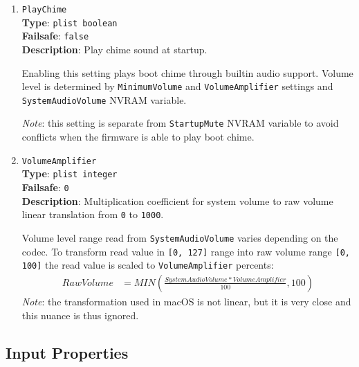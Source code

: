 \documentclass[]{article}
\makeatletter
\renewcommand{\label}[1]{%
\zref@wrapper@immediate{\oldlabel{#1}}}  %
\makeatother
\begin{document}
\begin{enumerate}
\item
  \texttt{PlayChime}\\
  \textbf{Type}: \texttt{plist\ boolean}\\
  \textbf{Failsafe}: \texttt{false}\\
  \textbf{Description}: Play chime sound at startup.

  Enabling this setting plays boot chime through builtin audio support. Volume level
  is determined by \texttt{MinimumVolume} and \texttt{VolumeAmplifier} settings and
  \texttt{SystemAudioVolume} NVRAM variable.

  \emph{Note}: this setting is separate from \texttt{StartupMute} NVRAM variable
  to avoid conflicts when the firmware is able to play boot chime.

\item
  \texttt{VolumeAmplifier}\\
  \textbf{Type}: \texttt{plist\ integer}\\
  \textbf{Failsafe}: \texttt{0}\\
  \textbf{Description}: Multiplication coefficient for system volume to raw volume linear translation
  from \texttt{0} to \texttt{1000}.

  Volume level range read from \texttt{SystemAudioVolume} varies depending on the codec.
  To transform read value in \texttt{[0, 127]} range into raw volume range \texttt{[0, 100]}
  the read value is scaled to \texttt{VolumeAmplifier} percents:
  \begin{align*}
      RawVolume &= MIN(\frac{SystemAudioVolume * VolumeAmplifier}{100}, 100)
  \end{align*}
  \emph{Note}: the transformation used in macOS is not linear, but it is very close
  and this nuance is thus ignored.

\end{enumerate}

\subsection{Input Properties}\label{uefiinputprops}
\end{document}

